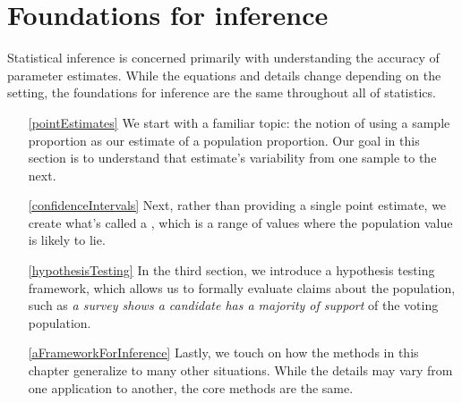 \chapter{Foundations for inference}
\label{foundationsForInference}
\label{ch_foundations_for_inf}
\renewcommand{\chapterfolder}{ch_foundations_for_inf}

Statistical inference is concerned primarily with understanding the
accuracy of parameter estimates. While the equations and details change
depending on the setting, the foundations for inference are the same
throughout all of statistics.
\begin{enumerate}
\item[\ref{pointEstimates}] We start with a familiar topic:
    the notion of using a sample proportion as our estimate
    of a population proportion. Our goal in this section
    is to understand that estimate's variability from one
    sample to the next.
\item[\ref{confidenceIntervals}] Next, rather than providing
    a single point estimate, we create what's called a
    , which is a range
    of values where the population value is likely to lie.
\item[\ref{hypothesisTesting}] In the third section,
    we introduce a hypothesis testing framework, which allows
    us to formally evaluate claims about the population,
    such as \emph{a survey shows a candidate has a majority
    of support} of the voting population.
\item[\ref{aFrameworkForInference}] Lastly, we touch on how
    the methods in this chapter generalize to many other
    situations. While the details may vary from one
    application to another, the core methods are the same.
\end{enumerate}









